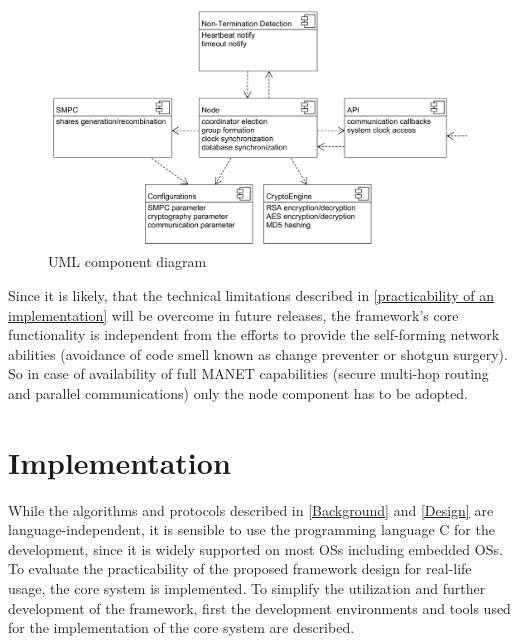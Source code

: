 \begin{figure}[!htbp] %
	\caption{\gls{UML} component diagram} \label{figure:UML component diagram}
	\includegraphics[scale=1.0]{figures/uml-component.png}
\end{figure}

Since it is likely, that the technical limitations described in \autoref{practicability of an implementation} will be overcome in future releases, the framework's core functionality is independent from the efforts to provide the self-forming network abilities (avoidance of code smell known as change preventer or shotgun surgery). So in case of availability of full \gls{MANET} capabilities (secure multi-hop routing and parallel communications) only the node component has to be adopted.



\chapter{Implementation} \label{Implementation}


While the algorithms and protocols described in \autoref{Background} and \autoref{Design} are language-independent, it is sensible to use the programming language C for the development, since it is widely supported on most \glspl{OS} including embedded \glspl{OS}. 
To evaluate the practicability of the proposed framework design for real-life usage, the core system is implemented.
To simplify the utilization and further development of the framework, first the development environments and tools used for the implementation of the core system are described.

